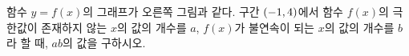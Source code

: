 \noindent\begin{minipage}[t]{0.58\linewidth}\vspace{0pt}\raggedright 함수 $y=f(x)$의 그래프가 오른쪽 그림과 같다. 구간 $(-1{,}\mkern3mu\mathopen{}4)$에서 함수 $f(x)$의 극한값이 존재하지 않는 $x$의 값의 개수를 $a$, $f(x)$가 불연속이 되는 $x$의 값의 개수를 $b$라 할 때, $ab$의 값을 구하시오.\end{minipage}\hfill\begin{minipage}[t]{0.4\linewidth}\vspace{0pt}\centering \resizebox{\ifdim\width>\linewidth\linewidth\else\width\fi}{!}{}\end{minipage}\par
